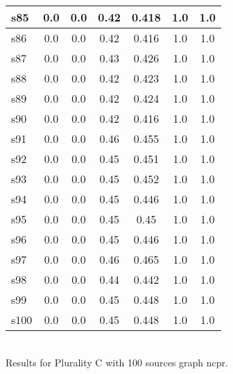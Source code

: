 \documentclass{article}
\begin{document}
\begin{tabular}{|l|c|c|c|c|c|c|}
\hline
s85 &0.0 & 0.0 & 0.42 & 0.418 & 1.0 & 1.0\\
\hline
s86 &0.0 & 0.0 & 0.42 & 0.416 & 1.0 & 1.0\\
\hline
s87 &0.0 & 0.0 & 0.43 & 0.426 & 1.0 & 1.0\\
\hline
s88 &0.0 & 0.0 & 0.42 & 0.423 & 1.0 & 1.0\\
\hline
s89 &0.0 & 0.0 & 0.42 & 0.424 & 1.0 & 1.0\\
\hline
s90 &0.0 & 0.0 & 0.42 & 0.416 & 1.0 & 1.0\\
\hline
s91 &0.0 & 0.0 & 0.46 & 0.455 & 1.0 & 1.0\\
\hline
s92 &0.0 & 0.0 & 0.45 & 0.451 & 1.0 & 1.0\\
\hline
s93 &0.0 & 0.0 & 0.45 & 0.452 & 1.0 & 1.0\\
\hline
s94 &0.0 & 0.0 & 0.45 & 0.446 & 1.0 & 1.0\\
\hline
s95 &0.0 & 0.0 & 0.45 & 0.45 & 1.0 & 1.0\\
\hline
s96 &0.0 & 0.0 & 0.45 & 0.446 & 1.0 & 1.0\\
\hline
s97 &0.0 & 0.0 & 0.46 & 0.465 & 1.0 & 1.0\\
\hline
s98 &0.0 & 0.0 & 0.44 & 0.442 & 1.0 & 1.0\\
\hline
s99 &0.0 & 0.0 & 0.45 & 0.448 & 1.0 & 1.0\\
\hline
s100 &0.0 & 0.0 & 0.45 & 0.448 & 1.0 & 1.0\\
\hline
\end{tabular}\\

\noindent Results for Plurality C with 100 sources graph ncpr.
\end{document}
